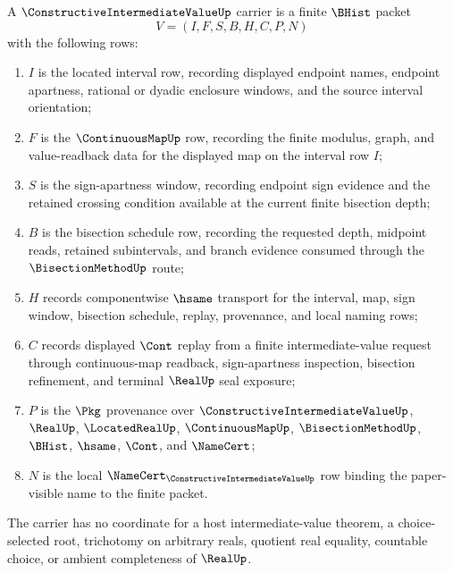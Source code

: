 \begin{definition}
\label{def:constructive-intermediate-value-carrier}
A $\ConstructiveIntermediateValueUp$ carrier is a finite $\BHist$ packet
$$
V=(I,F,S,B,H,C,P,N)
$$
with the following rows:
\begin{enumerate}
\item $I$ is the located interval row, recording displayed endpoint names, endpoint apartness, rational or dyadic enclosure windows, and the source interval orientation;
\item $F$ is the $\ContinuousMapUp$ row, recording the finite modulus, graph, and value-readback data for the displayed map on the interval row $I$;
\item $S$ is the sign-apartness window, recording endpoint sign evidence and the retained crossing condition available at the current finite bisection depth;
\item $B$ is the bisection schedule row, recording the requested depth, midpoint reads, retained subintervals, and branch evidence consumed through the $\BisectionMethodUp$ route;
\item $H$ records componentwise $\hsame$ transport for the interval, map, sign window, bisection schedule, replay, provenance, and local naming rows;
\item $C$ records displayed $\Cont$ replay from a finite intermediate-value request through continuous-map readback, sign-apartness inspection, bisection refinement, and terminal $\RealUp$ seal exposure;
\item $P$ is the $\Pkg$ provenance over $\ConstructiveIntermediateValueUp$, $\RealUp$, $\LocatedRealUp$, $\ContinuousMapUp$, $\BisectionMethodUp$, $\BHist$, $\hsame$, $\Cont$, and $\NameCert$;
\item $N$ is the local $\NameCert_{\ConstructiveIntermediateValueUp}$ row binding the paper-visible name to the finite packet.
\end{enumerate}
The carrier has no coordinate for a host intermediate-value theorem, a choice-selected root, trichotomy on arbitrary reals, quotient real equality, countable choice, or ambient completeness of $\RealUp$.
\end{definition}


